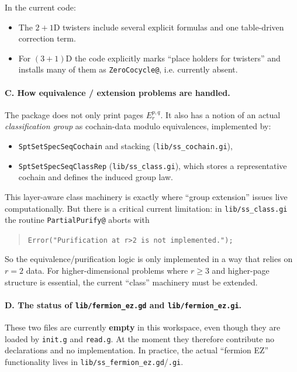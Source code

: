 \documentclass{SciPost}
\begin{document}
In the current code:
\begin{itemize}
    \item The $2{+}1$D twisters include several explicit formulas and one table-driven correction term.
    \item For $(3{+}1)$D the code explicitly marks ``place holders for twisters'' and installs many of them as \texttt{ZeroCocycle@}, i.e. currently absent.
\end{itemize}

\paragraph{C. How equivalence / extension problems are handled.}

The package does not only print pages $E_r^{p,q}$.
It also has a notion of an actual \emph{classification group} as cochain-data modulo equivalences, implemented by:
\begin{itemize}
    \item \texttt{SptSetSpecSeqCochain} and stacking (\texttt{lib/ss\_cochain.gi}),
    \item \texttt{SptSetSpecSeqClassRep} (\texttt{lib/ss\_class.gi}), which stores a representative cochain and defines the induced group law.
\end{itemize}

This layer-aware class machinery is exactly where ``group extension'' issues live computationally.
But there is a critical current limitation: in \texttt{lib/ss\_class.gi} the routine \texttt{PartialPurify@} aborts with
\begin{quote}
	\texttt{Error("Purification at r>2 is not implemented.");}
\end{quote}
So the equivalence/purification logic is only implemented in a way that relies on $r=2$ data.
For higher-dimensional problems where $r\ge 3$ and higher-page structure is essential, the current ``class'' machinery must be extended.

\paragraph{D. The status of \texttt{lib/fermion\_ez.gd} and \texttt{lib/fermion\_ez.gi}.}

These two files are currently \textbf{empty} in this workspace, even though they are loaded by \texttt{init.g} and \texttt{read.g}.
At the moment they therefore contribute no declarations and no implementation.
In practice, the actual ``fermion EZ'' functionality lives in \texttt{lib/ss\_fermion\_ez.gd}/\texttt{.gi}.
\end{document}
